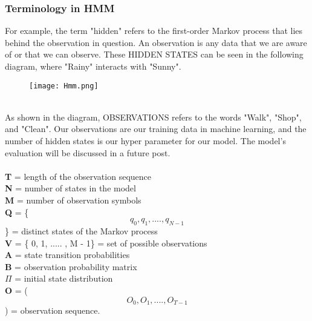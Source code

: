 \documentclass[12pt,a4paper]{article}
\begin{document}
\subsubsection*{Terminology in HMM}
For example, the term "hidden" refers to the first-order Markov process that lies behind the observation in question. An observation is any data that we are aware of or that we can observe. These HIDDEN STATES can be seen in the following diagram, where "Rainy" interacts with "Sunny".
\\
\begin{figure}[htp]
    \centering
    \texttt{[image: Hmm.png]}
\end{figure}
\\
As shown in the diagram, OBSERVATIONS refers to the words "Walk", "Shop", and "Clean". Our observations are our training data in machine learning, and the number of hidden states is our hyper parameter for our model. The model's evaluation will be discussed in a future post.
\\
\\
\textbf{T} = length of the observation sequence
\\
\textbf{N} = number of states in the model 
\\
\textbf{M} = number of observation symbols
\\
\textbf{Q} = \{ \[q_0,q_1,.... ,q_{N - 1}\] \} = distinct states of the Markov process
\\
\textbf{V} = \{ 0, 1, ..... , M - 1\} = set of possible observations
\\
\textbf{A} = state transition probabilities
\\
\textbf{B} = observation probability matrix
\\
\textbf{$\Pi$} = initial state distribution
\\
\textbf{O} = ( \[ O_0, O_1, ...., O_{T - 1} \] ) = observation sequence.
\end{document}
